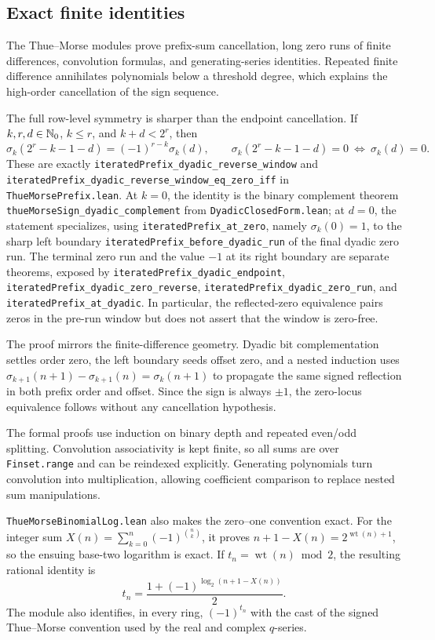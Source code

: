 \documentclass[11pt,oneside]{article}
\theoremstyle{definition}
\theoremstyle{remark}
\begin{document}
\subsection{Exact finite identities}
The Thue--Morse modules prove prefix-sum cancellation, long zero runs of finite differences, convolution formulas, and generating-series identities.  Repeated finite difference annihilates polynomials below a threshold degree, which explains the high-order cancellation of the sign sequence.

The full row-level symmetry is sharper than the endpoint cancellation.  If
$k,r,d\in\mathbb{N}_{0}$, $k\le r$, and $k+d<2^r$, then
\[
 \sigma_k(2^r-k-1-d)=(-1)^{r-k}\sigma_k(d),
 \qquad
 \sigma_k(2^r-k-1-d)=0\ \Longleftrightarrow\ \sigma_k(d)=0.
\]
These are exactly
\nolinkurl{iteratedPrefix_dyadic_reverse_window} and
\nolinkurl{iteratedPrefix_dyadic_reverse_window_eq_zero_iff} in
\nolinkurl{ThueMorsePrefix.lean}.  At $k=0$, the identity is the binary
complement theorem \nolinkurl{thueMorseSign_dyadic_complement} from
\nolinkurl{DyadicClosedForm.lean}; at $d=0$, the statement specializes, using
\nolinkurl{iteratedPrefix_at_zero}, namely $\sigma_k(0)=1$, to the sharp left
boundary \nolinkurl{iteratedPrefix_before_dyadic_run} of the final dyadic zero run.  The
terminal zero run and the value $-1$ at its right boundary are separate
theorems, exposed by \nolinkurl{iteratedPrefix_dyadic_endpoint},
\nolinkurl{iteratedPrefix_dyadic_zero_reverse},
\nolinkurl{iteratedPrefix_dyadic_zero_run}, and
\nolinkurl{iteratedPrefix_at_dyadic}.  In particular, the reflected-zero
equivalence pairs zeros in the pre-run window but does not assert that the
window is zero-free.

The proof mirrors the finite-difference geometry.  Dyadic bit complementation
settles order zero, the left boundary seeds offset zero, and a nested induction
uses
$\sigma_{k+1}(n+1)-\sigma_{k+1}(n)=\sigma_k(n+1)$ to propagate the same signed
reflection in both prefix order and offset.  Since the sign is always
$\pm1$, the zero-locus equivalence follows without any cancellation
hypothesis.

The formal proofs use induction on binary depth and repeated even/odd splitting.  Convolution associativity is kept finite, so all sums are over \nolinkurl{Finset.range} and can be reindexed explicitly.  Generating polynomials turn convolution into multiplication, allowing coefficient comparison to replace nested sum manipulations.

\nolinkurl{ThueMorseBinomialLog.lean} also makes the zero--one convention
exact.  For the integer sum
\(X(n)=\sum_{k=0}^{n}(-1)^{\binom nk}\), it proves
\(n+1-X(n)=2^{\operatorname{wt}(n)+1}\), so the ensuing base-two logarithm
is exact.  If \(t_n=\operatorname{wt}(n)\bmod2\), the resulting rational
identity is
\[
 t_n=\frac{1+(-1)^{\log_2(n+1-X(n))}}2.
\]
The module also identifies, in every ring,
\((-1)^{t_n}\) with the cast of the signed Thue--Morse convention used by the
real and complex \(q\)-series.
\end{document}
